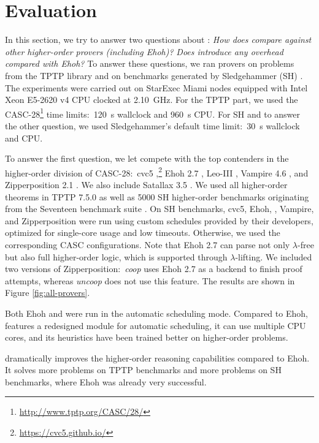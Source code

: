\section{Evaluation}
\label{sec:ehoh2:eval}

In this section, we try to answer two questions about \ehohii{}: \emph{How does
\ehohii{} compare against other higher-order provers (including Ehoh)?} \emph{Does
\ehohii{} introduce any overhead compared with Ehoh?} To answer
these questions, we ran provers on problems from the TPTP library \cite{gs-17-tptp} and on
benchmarks generated by Sledgehammer (SH) \cite{pb-12-sh}.
The experiments were carried out on StarExec Miami
\cite{sst-14-starexec} nodes equipped with Intel Xeon E5-2620 v4 CPU clocked at
2.10~GHz. For the TPTP part, we used the CASC-28\footnote{\url{http://www.tptp.org/CASC/28/}} time limits:\ 120~s
wallclock and 960~s CPU. For SH and to answer the other question, we used Sledgehammer's
default time limit:\ 30~s wallclock and CPU.

To answer the first question, we let
\ehohii{} compete with the top contenders in the higher-order division of
CASC-28:\ cvc5 ,\footnote{\url{https://cvc5.github.io/}}
Ehoh 2.7
\cite{section-ehoh}, Leo-III  \cite{sb-21-leo3}, Vampire 4.6
\cite{br-20-full-sup-w-combs}, and Zipperposition 2.1
\cite{section-making-ho-work}. We also include Satallax 3.5
\cite{cb-12-satallax}. We used all  higher-order
theorems in TPTP 7.5.0 as well as 5000 SH higher-order benchmarks
originating from the Seventeen benchmark suite \cite{desharnais-et-al-202x}.
On SH benchmarks,
cvc5, Ehoh, \ehohii{}, Vampire, and Zipperposition were run using custom schedules provided by
their developers, optimized for single-core usage and low timeouts.
Otherwise, we used the corresponding CASC configurations.
Note that Ehoh 2.7 can parse not only $\lambda$-free but also full higher-order logic,
which is supported through $\lambda$-lifting.
We included two versions of Zipperposition:\ \emph{coop} uses Ehoh 2.7 as a backend to finish proof attempts,
whereas \emph{uncoop} does not use this feature. The results
are shown in Figure \ref{fig:all-provers}.

Both Ehoh and \ehohii{} were run in the automatic scheduling mode. Compared to Ehoh,
\ehohii{} features a redesigned module for automatic scheduling, it
can use multiple CPU cores, and its heuristics have been trained better on higher-order problems.

\ehohii{} dramatically improves the higher-order reasoning capabilities
compared to Ehoh. It solves  more problems on TPTP benchmarks
and  more problems on SH benchmarks, where Ehoh was already very
successful.

